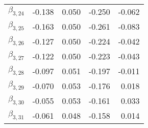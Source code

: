 \begin{tabular}{lrrrr}
$\beta_{3,24}$ & -0.138 &     0.050 &   -0.250 &    -0.062 \\
$\beta_{3,25}$ & -0.163 &     0.050 &   -0.261 &    -0.083 \\
$\beta_{3,26}$ & -0.127 &     0.050 &   -0.224 &    -0.042 \\
$\beta_{3,27}$ & -0.122 &     0.050 &   -0.223 &    -0.043 \\
$\beta_{3,28}$ & -0.097 &     0.051 &   -0.197 &    -0.011 \\
$\beta_{3,29}$ & -0.070 &     0.053 &   -0.176 &     0.018 \\
$\beta_{3,30}$ & -0.055 &     0.053 &   -0.161 &     0.033 \\
$\beta_{3,31}$ & -0.061 &     0.048 &   -0.158 &     0.014 \\
\bottomrule
\end{tabular}
